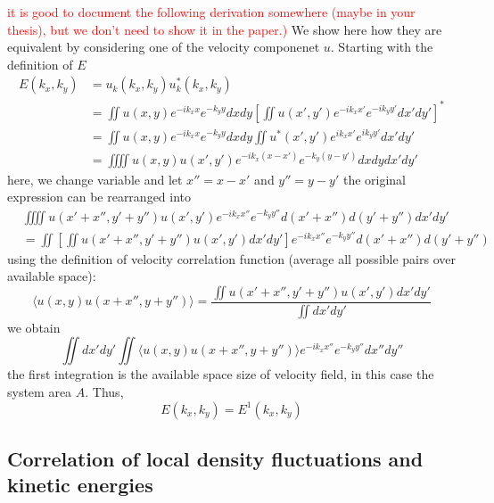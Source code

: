 \documentclass[twocolumn,aps,prx,amsmath,amssymb,longbibliography]{revtex4-2}
\begin{document}
\textcolor{red}{it is good to document the following derivation somewhere (maybe in your thesis), but we don't need to show it in the paper.)}
We show here how they are equivalent by considering one of the velocity componenet $u$. Starting with the definition of $E$
\begin{equation}
\begin{split}
E(k_x, k_y) &= u_k(k_x, k_y)u_k^*(k_x, k_y)\\
& = \iint u(x, y)e^{-ik_xx}e^{-k_yy}dxdy\left[\iint u(x', y')e^{-ik_xx'}e^{-ik_yy'}dx'dy'\right]^*\\
& = \iint u(x, y)e^{-ik_xx}e^{-k_yy}dxdy\iint u^*(x', y')e^{ik_xx'}e^{ik_yy'}dx'dy'\\
& = \iiiint u(x, y)u(x', y')e^{-ik_x(x-x')}e^{-k_y(y-y')}dxdydx'dy'
\end{split}
\end{equation}
here, we change variable and let $x'' = x - x'$ and $y'' = y - y'$ the original expression can be rearranged into
\begin{equation}
\begin{split}
& \iiiint u(x'+x'', y'+y'')u(x', y')e^{-ik_xx''}e^{-k_yy''}d(x'+x'')d(y'+y'')dx'dy'\\
& = \iint \left[\iint u(x'+x'', y'+y'')u(x', y')dx'dy'\right] e^{-ik_xx''}e^{-k_yy''} d(x'+x'')d(y'+y'')
\end{split}
\end{equation}
using the definition of velocity correlation function (average all possible pairs over available space):
\begin{equation}
\langle u(x, y)u(x+x'', y+y'') \rangle = \frac{\iint u(x'+x'', y'+y'')u(x', y')dx'dy'}{\iint dx'dy'}
\end{equation}
we obtain
\begin{equation}
\iint dx'dy'\iint \langle u(x, y)u(x+x'', y+y'') \rangle e^{-ik_xx''}e^{-k_yy''} dx''dy''
\end{equation}
the first integration is the available space size of velocity field, in this case the system area $A$. Thus,
\begin{equation}
E(k_x, k_y) = E^1(k_x, k_y)
\end{equation}

\subsection{Correlation of local density fluctuations and kinetic energies}
\end{document}
